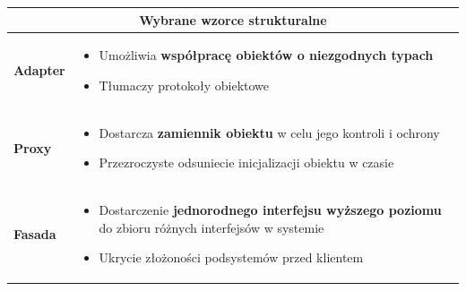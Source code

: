 \documentclass[a4paper]{article}
\begin{document}
\begin{table}[H]
\begin{center}
\begin{tabular}{  p{3cm} p{12cm}  }
                \bottomrule

            \end{tabular}
        \end{center}
    \end{table}

    \begin{table}[H]
        \begin{center}
            \begin{tabular}{  p{3cm} p{12cm}  }
                \toprule
                \multicolumn{2}{c}{Wybrane wzorce strukturalne}\\
                \toprule

                \textbf{Adapter}
                &
                \begin{itemize}
                    \item Umożliwia \textbf{współpracę obiektów o niezgodnych typach}
                    \item Tłumaczy protokoły obiektowe
                \end{itemize}
                \\

                \cmidrule(r){1-1}\cmidrule(l){2-2}

                \textbf{Proxy}
                &
                \begin{itemize}
                    \item Dostarcza \textbf{zamiennik obiektu} w celu jego kontroli i ochrony
                    \item Przezroczyste odsuniecie inicjalizacji obiektu w czasie
                \end{itemize}
                \\

                \cmidrule(r){1-1}\cmidrule(l){2-2}
                \textbf{Fasada}
                &
                \begin{itemize}
                    \item Dostarczenie \textbf{jednorodnego interfejsu wyższego poziomu} do zbioru różnych interfejsów w systemie
                    \item Ukrycie złożoności podsystemów przed klientem
                \end{itemize}
                \\
                \bottomrule

            \end{tabular}
        \end{center}
    \end{table}
\end{document}
